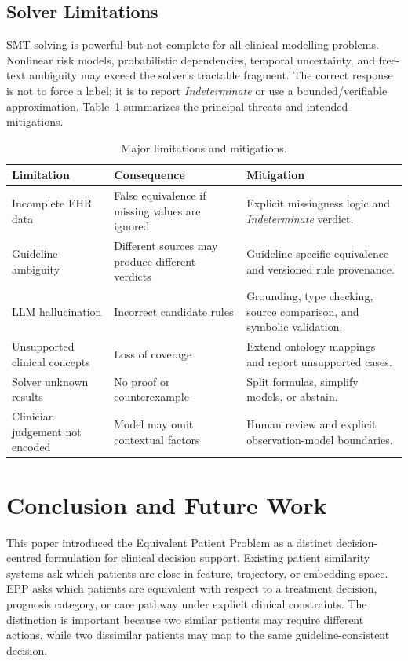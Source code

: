 \documentclass[english,5p,twocolumn,preprint]{elsarticle}
\begin{document}
\subsection{Solver Limitations}
SMT solving is powerful but not complete for all clinical modelling problems. Nonlinear risk models, probabilistic dependencies, temporal uncertainty, and free-text ambiguity may exceed the solver's tractable fragment. The correct response is not to force a label; it is to report \emph{Indeterminate} or use a bounded/verifiable approximation. Table~\ref{tab:limitations} summarizes the principal threats and intended mitigations.

\begin{table}[ht!]
\centering
\caption{Major limitations and mitigations.}
\label{tab:limitations}
\begin{tabularx}{\textwidth}{p{}p{}X}
\toprule
\textbf{Limitation} & \textbf{Consequence} & \textbf{Mitigation} \\
\midrule
Incomplete EHR data & False equivalence if missing values are ignored & Explicit missingness logic and \emph{Indeterminate} verdict. \\
Guideline ambiguity & Different sources may produce different verdicts & Guideline-specific equivalence and versioned rule provenance. \\
LLM hallucination & Incorrect candidate rules & Grounding, type checking, source comparison, and symbolic validation. \\
Unsupported clinical concepts & Loss of coverage & Extend ontology mappings and report unsupported cases. \\
Solver unknown results & No proof or counterexample & Split formulas, simplify models, or abstain. \\
Clinician judgement not encoded & Model may omit contextual factors & Human review and explicit observation-model boundaries. \\
\bottomrule
\end{tabularx}
\end{table}

\section{Conclusion and Future Work}
This paper introduced the Equivalent Patient Problem as a distinct decision-centred formulation for clinical decision support. Existing patient similarity systems ask which patients are close in feature, trajectory, or embedding space. EPP asks which patients are equivalent with respect to a treatment decision, prognosis category, or care pathway under explicit clinical constraints. The distinction is important because two similar patients may require different actions, while two dissimilar patients may map to the same guideline-consistent decision. 
\end{document}
